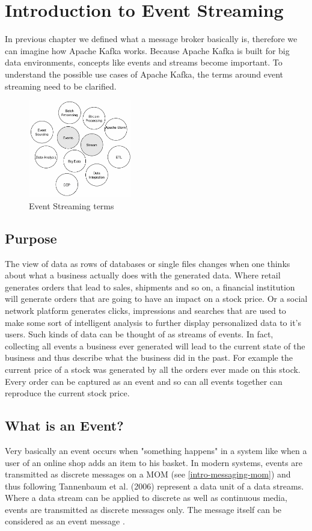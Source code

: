 \chapter{Introduction to Event Streaming}

In previous chapter we defined what a message broker basically is, therefore we
can imagine how Apache Kafka works. Because Apache Kafka is built for big data
environments, concepts like events and streams become
important. To understand the possible use cases of Apache Kafka, the terms
around event streaming need to be clarified. 

\begin{figure}[H]
    \centering
    \includegraphics[width=0.4\textwidth]{images/evenstreaming-intro.png}
    \caption{Event Streaming terms}
    \label{fig:evenstreaming-intro}
\end{figure}

\section{Purpose}
The view of data as rows of databases or single files changes when one thinks
about what a business actually does with the generated data. Where retail
generates orders that lead to sales, shipments and so on, a financial
institution will generate orders that are going to have an impact on a stock
price. Or a social network platform generates clicks, impressions and searches
that are used to make some sort of intelligent analysis to further display
personalized data to it's users. Such kinds of data can be thought of as streams
of events. In fact, collecting all events a business ever generated will lead to
the current state of the business and thus describe what the business did in the
past. For example the current price of a stock was generated by all the orders
ever made on this stock. Every order can be captured as an event and so can all
events together can reproduce the current stock price.

\section{What is an Event?}
\label{intro-datastream-datastream}
Very basically an event occurs when "something happens"  in a system like when a
user of an online shop adds an item to his basket. In modern systems, events are
transmitted as discrete messages on a MOM (see \ref{intro-messaging-mom}) and
thus following Tannenbaum et al. (2006) represent a data unit of a data
streams. Where a data stream can be applied to discrete as well as continuous
media, events are transmitted as discrete messages only. The message itself
can be considered as an event message \cite{EIP03}.

